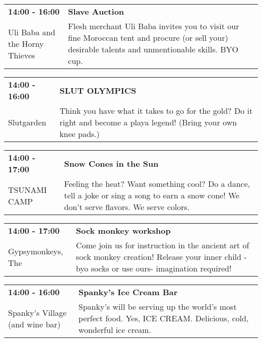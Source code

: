 \begin{tabular}{ p{1in} p{2.2in} }
    \textbf{14:00 - 16:00} & \textbf{Slave Auction} \\
    Uli Baba and the Horny Thieves \newline  & Flesh merchant Uli Baba invites you to visit our fine Moroccan tent
and procure (or sell your) desirable talents and unmentionable skills.
BYO cup. \\
    \hline 
\end{tabular}
    
\begin{tabular}{ p{1in} p{2.2in} }
    \textbf{14:00 - 16:00} & \textbf{SLUT OLYMPICS} \\
    Slutgarden \newline  & Think you have what it takes to go for the gold? Do it right and become a playa legend! (Bring your own knee pads.) \\
    \hline 
\end{tabular}
    
\begin{tabular}{ p{1in} p{2.2in} }
    \textbf{14:00 - 17:00} & \textbf{Snow Cones in the Sun} \\
    TSUNAMI CAMP \newline  & Feeling the heat?  Want something cool?
Do a dance, tell a joke or sing a song to earn a snow cone!  We don't serve flavors. We serve colors. \\
    \hline 
\end{tabular}
    
\begin{tabular}{ p{1in} p{2.2in} }
    \textbf{14:00 - 17:00} & \textbf{Sock monkey workshop} \\
    Gypsymonkeys, The \newline  & Come join us for instruction in the ancient art of sock monkey creation! Release your inner child - byo socks or use ours- imagination required! \\
    \hline 
\end{tabular}
    
\begin{tabular}{ p{1in} p{2.2in} }
    \textbf{14:00 - 16:00} & \textbf{Spanky's Ice Cream Bar} \\
    Spanky's Village (and wine bar) \newline  & Spanky's will be serving up the world's most perfect food.  Yes, ICE CREAM.  Delicious, cold, wonderful ice cream. \\
    \hline 
\end{tabular}
    
